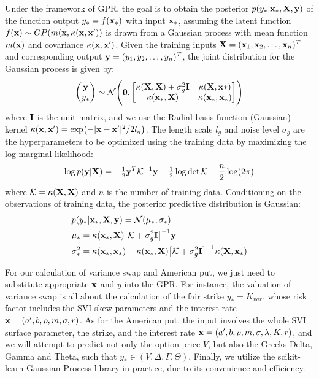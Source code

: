 \documentclass[%
 reprint,
 superscriptaddress,
nobibnotes,
 amsmath,amssymb,
 aps,
]{revtex4-2}
\begin{document}
Under the framework of GPR\cite{williams2006gaussian,murphy2012machine}, the goal is to obtain the posterior $p(y_*|\vb{x}_*,\vb{X},\vb{y})$ of the function output $y_* = f(\vb{x}_*)$ with input $\vb{x}_*$, assuming the latent function $f(\vb{x})\sim GP(m(\vb{x},\kappa(\vb{x},\vb{x}'))$ is drawn from a Gaussian process with mean function $m(\vb{x})$ and covariance $\kappa({\vb{x},\vb{x}'})$. Given the training inputs $\vb{X}=(\vb{x}_1, \vb{x}_2, \dots,\vb{x}_n)^T$ and corresponding output $\vb{y}=(y_1,y_2,\dots,y_n)^T$, the joint distribution for the Gaussian process is given by\cite{williams2006gaussian}:
\begin{equation}
    \mqty( \vb{y}\\ y_*)
\sim
\mathcal{N} \Biggl( \vb{0},
\mqty[
\kappa(\vb{X},\vb{X}) + \sigma_g^2 \vb{I} & \kappa(\vb{X},\vb{x}*)\\
\kappa(\vb{x}_*,\vb{X}) & \kappa(\vb{x}_*,\vb{x}_*)
] \Biggr)
\end{equation}
where $\vb{I}$ is the unit matrix, and we use the Radial basis function (Gaussian) kernel $\kappa(\vb{x},\vb{x}')=\exp(-|\vb{x}-\vb{x}'|^2/2l_g)$. The length scale $l_g$ and noise level $\sigma_g$ are the hyperparameters to be optimized using the training data by maximizing the log marginal likelihood\cite{williams2006gaussian}:
\begin{equation}
\log p(\vb{y}|\vb{X}) = -\tfrac12 \vb{y}^T \mathcal{K}^{-1}\vb{y} -\tfrac12\log \det \mathcal{K} -\frac{n}{2}\log(2\pi)
\end{equation}
where $\mathcal{K} = \kappa(\vb{X},\vb{X})$ and $n$ is the number of training data. Conditioning on the observations of training data, the posterior predictive distribution is Gaussian:
\begin{equation}
\begin{aligned}
    &p(y_*|\vb{x}_*,\vb{X},\vb{y}) = \mathcal{N}(\mu_*,\sigma_*)\\
    &\mu_* = \kappa(\vb{x}_*,\vb{X})\bigl[\mathcal{K} + \sigma_g^2 \vb{I}\bigr]^{-1}\vb{y} \\
    &\sigma^2_* = \kappa(\vb{x}_*,\vb{x}_*) - \kappa(\vb{x}_*,\vb{X})\bigl[\mathcal{K} + \sigma_g^2 \vb{I}\bigr]^{-1}\kappa(\vb{X},\vb{x}_*) \\
\end{aligned}
\end{equation}

For our calculation of variance swap and American put, we just need to substitute appropriate $\vb{x}$ and $y$ into the GPR. For instance, the valuation of variance swap is all about the calculation of the fair strike $y_*=K_{var}$, whose risk factor includes the SVI skew parameters and the interest rate $\vb{x} = (a',b, \rho,m,\sigma,r)$. As for the American put, the input involves the whole SVI surface parameter, the strike, and the interest rate $\vb{x}=(a',b, \rho,m,\sigma,\lambda,K, r)$, and we will attempt to predict not only the option price $V$, but also the Greeks Delta, Gamma and Theta, such that $y_*\in (V,\Delta,\Gamma,\Theta)$. Finally, we utilize
the scikit-learn \cite{pedregosa2011scikit, buitinck2013api} Gaussian Process library in practice, due to its convenience and efficiency.
\end{document}
